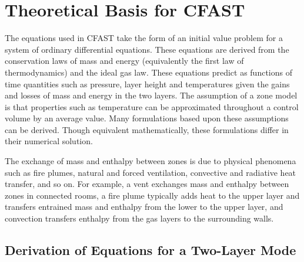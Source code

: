 \chapter{Theoretical Basis for CFAST}
\label{sec:Theory_Chapter}

The equations used in CFAST take the form of an initial value problem for a system of ordinary differential equations. These equations are derived from the conservation laws of mass and energy (equivalently the first law of thermodynamics) and the ideal gas law. These equations predict as functions of time quantities such as pressure, layer height and temperatures given the gains and losses of mass and energy in the two layers. The assumption of a zone model is that properties such as temperature can be approximated throughout a control volume by an average value. Many formulations based upon these assumptions can be derived. Though equivalent mathematically, these formulations differ in their numerical solution.

The exchange of mass and enthalpy between zones is due to physical phenomena such as fire plumes, natural and forced ventilation, convective and radiative heat transfer, and so on. For example, a vent exchanges mass and enthalpy between zones in connected rooms, a fire plume typically adds heat to the upper layer and transfers entrained mass and enthalpy from the lower to the upper layer, and convection transfers enthalpy from the gas layers to the surrounding walls.



\section{Derivation of Equations for a Two-Layer Mode}

